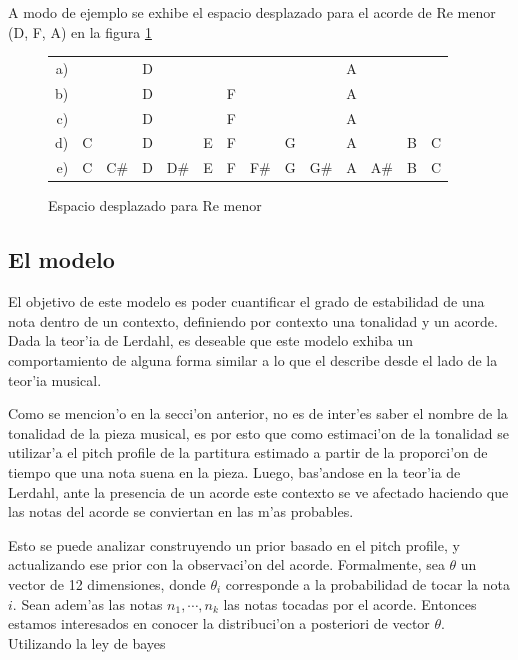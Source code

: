 A modo de ejemplo se exhibe el espacio desplazado para el acorde de Re menor (D, F, A) en la figura \ref{fig:dm_space}

\begin{figure}[!h]
\begin{center}
\begin{tabular}{r c c c c c c c c c c c c c} 
a) &   &     & D &     &   &   &     &   &     & A &     &   &  \\
b) &   &     & D &     &   & F &     &   &     & A &     &   &  \\
c) &   &     & D &     &   & F &     &   &     & A &     &   &  \\
d) & C &     & D &     & E & F &     & G &     & A &     & B & C\\
e) & C & C\# & D & D\# & E & F & F\# & G & G\# & A & A\# & B & C\\
\end{tabular}
\newline
\caption{ Espacio desplazado para Re menor}
\label{fig:dm_space}
\end{center}
\end{figure}

\subsection{El modelo}
\label{sec:harmonic_context_model}
El objetivo de este modelo es poder cuantificar el grado de estabilidad de una nota dentro de un contexto, definiendo por contexto una tonalidad y un acorde. 
Dada la teor'ia de Lerdahl, es deseable que este modelo exhiba un comportamiento de alguna forma similar a lo que el describe desde el lado de la teor'ia musical. 

Como se mencion'o en la secci'on anterior, no es de inter'es saber el nombre de la tonalidad de la pieza musical, es por esto que como estimaci'on de la 
tonalidad se utilizar'a el pitch profile de la partitura estimado a partir de la proporci'on de tiempo que una nota suena en la pieza. Luego, bas'andose en 
la teor'ia de Lerdahl, ante la presencia de un acorde este contexto se ve afectado haciendo que las notas del acorde se conviertan en las m'as probables.  

Esto se puede analizar construyendo un prior basado en el pitch profile, y actualizando ese prior con la observaci'on del acorde. 
Formalmente, sea $\theta$ un vector de 12 dimensiones, donde $\theta_i$ corresponde a la probabilidad de tocar la nota $i$. Sean adem'as las notas $n_1, \cdots, n_k$ las notas 
tocadas por el acorde. Entonces estamos interesados en conocer la distribuci'on a posteriori de vector $\theta$. Utilizando la ley de bayes

